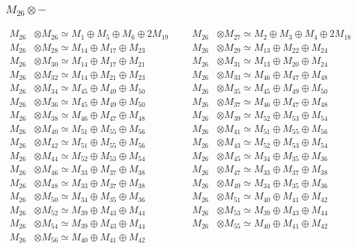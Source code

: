 \subsubsection{$ M_{26}\otimes -$}
\begin{align*}
M_{26} &\otimes M_{26} \simeq M_{1} \oplus M_{5} \oplus M_{6} \oplus 2M_{19} &&& M_{26} &\otimes M_{27} \simeq M_{2} \oplus M_{3} \oplus M_{4} \oplus 2M_{18}\\
M_{26} &\otimes M_{28} \simeq M_{14} \oplus M_{17} \oplus M_{23} &&& M_{26} &\otimes M_{29} \simeq M_{13} \oplus M_{22} \oplus M_{24}\\
M_{26} &\otimes M_{30} \simeq M_{14} \oplus M_{17} \oplus M_{21} &&& M_{26} &\otimes M_{31} \simeq M_{13} \oplus M_{20} \oplus M_{24}\\
M_{26} &\otimes M_{32} \simeq M_{14} \oplus M_{21} \oplus M_{23} &&& M_{26} &\otimes M_{33} \simeq M_{46} \oplus M_{47} \oplus M_{48}\\
M_{26} &\otimes M_{34} \simeq M_{45} \oplus M_{49} \oplus M_{50} &&& M_{26} &\otimes M_{35} \simeq M_{45} \oplus M_{49} \oplus M_{50}\\
M_{26} &\otimes M_{36} \simeq M_{45} \oplus M_{49} \oplus M_{50} &&& M_{26} &\otimes M_{37} \simeq M_{46} \oplus M_{47} \oplus M_{48}\\
M_{26} &\otimes M_{38} \simeq M_{46} \oplus M_{47} \oplus M_{48} &&& M_{26} &\otimes M_{39} \simeq M_{52} \oplus M_{53} \oplus M_{54}\\
M_{26} &\otimes M_{40} \simeq M_{51} \oplus M_{55} \oplus M_{56} &&& M_{26} &\otimes M_{41} \simeq M_{51} \oplus M_{55} \oplus M_{56}\\
M_{26} &\otimes M_{42} \simeq M_{51} \oplus M_{55} \oplus M_{56} &&& M_{26} &\otimes M_{43} \simeq M_{52} \oplus M_{53} \oplus M_{54}\\
M_{26} &\otimes M_{44} \simeq M_{52} \oplus M_{53} \oplus M_{54} &&& M_{26} &\otimes M_{45} \simeq M_{34} \oplus M_{35} \oplus M_{36}\\
M_{26} &\otimes M_{46} \simeq M_{33} \oplus M_{37} \oplus M_{38} &&& M_{26} &\otimes M_{47} \simeq M_{33} \oplus M_{37} \oplus M_{38}\\
M_{26} &\otimes M_{48} \simeq M_{33} \oplus M_{37} \oplus M_{38} &&& M_{26} &\otimes M_{49} \simeq M_{34} \oplus M_{35} \oplus M_{36}\\
M_{26} &\otimes M_{50} \simeq M_{34} \oplus M_{35} \oplus M_{36} &&& M_{26} &\otimes M_{51} \simeq M_{40} \oplus M_{41} \oplus M_{42}\\
M_{26} &\otimes M_{52} \simeq M_{39} \oplus M_{43} \oplus M_{44} &&& M_{26} &\otimes M_{53} \simeq M_{39} \oplus M_{43} \oplus M_{44}\\
M_{26} &\otimes M_{54} \simeq M_{39} \oplus M_{43} \oplus M_{44} &&& M_{26} &\otimes M_{55} \simeq M_{40} \oplus M_{41} \oplus M_{42}\\
M_{26} &\otimes M_{56} \simeq M_{40} \oplus M_{41} \oplus M_{42}
\end{align*}


